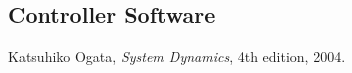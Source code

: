 \documentclass{article}
\begin{document}
	\subsection{Controller Software}
	
\begin{thebibliography}{9}	%

		Katsuhiko Ogata,
		\textit{System Dynamics},
		4th edition,
		2004.

\end{thebibliography}
\end{document}
